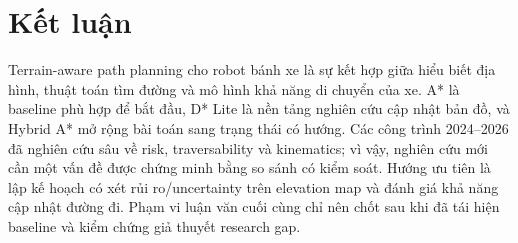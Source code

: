 \documentclass[11pt,a4paper]{article}
\begin{document}
\section{Kết luận}
Terrain-aware path planning cho robot bánh xe là sự kết hợp
giữa hiểu biết địa hình, thuật toán tìm đường và mô hình
khả năng di chuyển của xe. A* là baseline phù hợp để bắt đầu,
D* Lite là nền tảng nghiên cứu cập nhật bản đồ, và Hybrid A*
mở rộng bài toán sang trạng thái có hướng. Các công trình
2024--2026 đã nghiên cứu sâu về risk, traversability
và kinematics; vì vậy, nghiên cứu mới cần một vấn đề
được chứng minh bằng so sánh có kiểm soát.
Hướng ưu tiên là lập kế hoạch có xét rủi ro/uncertainty
trên elevation map và đánh giá khả năng cập nhật đường đi.
Phạm vi luận văn cuối cùng chỉ nên chốt sau khi đã tái hiện
baseline và kiểm chứng giả thuyết research gap.

\clearpage
\printbibliography[heading=bibintoc,title={Tài liệu tham khảo}]
\end{document}
